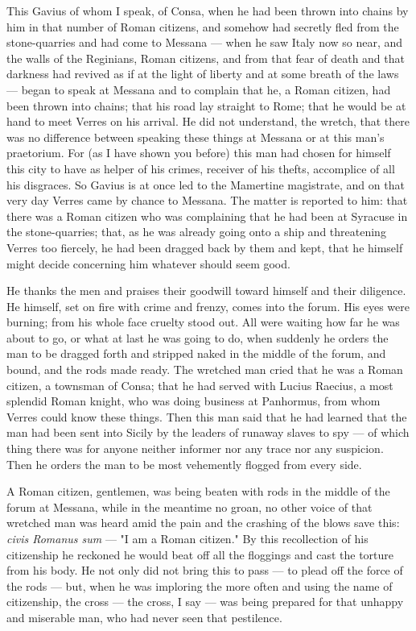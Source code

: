  This Gavius of whom I speak, of Consa, when he had been thrown into chains by him in that number of Roman citizens, and somehow had secretly fled from the stone-quarries and had come to Messana --- when he saw Italy now so near, and the walls of the Reginians, Roman citizens, and from that fear of death and that darkness had revived as if at the light of liberty and at some breath of the laws --- began to speak at Messana and to complain that he, a Roman citizen, had been thrown into chains; that his road lay straight to Rome; that he would be at hand to meet Verres on his arrival. He did not understand, the wretch, that there was no difference between speaking these things at Messana or at this man's praetorium. For (as I have shown you before) this man had chosen for himself this city to have as helper of his crimes, receiver of his thefts, accomplice of all his disgraces. So Gavius is at once led to the Mamertine magistrate, and on that very day Verres came by chance to Messana. The matter is reported to him: that there was a Roman citizen who was complaining that he had been at Syracuse in the stone-quarries; that, as he was already going onto a ship and threatening Verres too fiercely, he had been dragged back by them and kept, that he himself might decide concerning him whatever should seem good.

 He thanks the men and praises their goodwill toward himself and their diligence. He himself, set on fire with crime and frenzy, comes into the forum. His eyes were burning; from his whole face cruelty stood out. All were waiting how far he was about to go, or what at last he was going to do, when suddenly he orders the man to be dragged forth and stripped naked in the middle of the forum, and bound, and the rods made ready. The wretched man cried that he was a Roman citizen, a townsman of Consa; that he had served with Lucius Raecius, a most splendid Roman knight, who was doing business at Panhormus, from whom Verres could know these things. Then this man said that he had learned that the man had been sent into Sicily by the leaders of runaway slaves to spy --- of which thing there was for anyone neither informer nor any trace nor any suspicion. Then he orders the man to be most vehemently flogged from every side.

 A Roman citizen, gentlemen, was being beaten with rods in the middle of the forum at Messana, while in the meantime no groan, no other voice of that wretched man was heard amid the pain and the crashing of the blows save this: \textit{civis Romanus sum} --- "I am a Roman citizen." By this recollection of his citizenship he reckoned he would beat off all the floggings and cast the torture from his body. He not only did not bring this to pass --- to plead off the force of the rods --- but, when he was imploring the more often and using the name of citizenship, the cross --- the cross, I say --- was being prepared for that unhappy and miserable man, who had never seen that pestilence.

